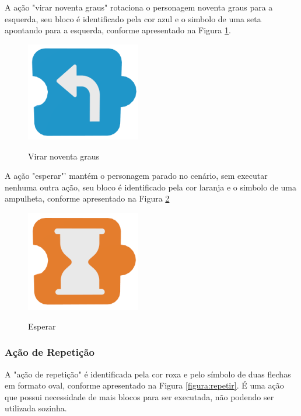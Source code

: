         A ação "virar noventa graus" rotaciona o personagem noventa graus para a esquerda, seu bloco é identificado pela cor azul e o simbolo de uma seta apontando para a esquerda, conforme apresentado na Figura \ref{figura:virar}.
        
        \begin{figure}[H]
            \caption{Virar noventa graus}
            \centering
            \includegraphics[width=5cm]{Imagens/Cap3/Blocos/Virar.png}
            \label{figura:virar}
        \end{figure}
        
        A ação "esperar"' mantém o personagem parado no cenário, sem executar nenhuma outra ação, seu bloco é identificado pela cor laranja e o simbolo de uma ampulheta, conforme apresentado na Figura \ref{figura:esperar}
        
        \begin{figure}[H]
            \caption{Esperar}
            \centering
            \includegraphics[width=5cm]{Imagens/Cap3/Blocos/Esperar.png}
            \label{figura:esperar}
        \end{figure}
        
    \subsubsection{Ação de Repetição}
        A "ação de repetição" é identificada pela cor roxa e pelo símbolo de duas flechas em formato oval, conforme apresentado na Figura \ref{figura:repetir}. É uma ação que possui necessidade de mais blocos para ser executada, não podendo ser utilizada sozinha.
        
